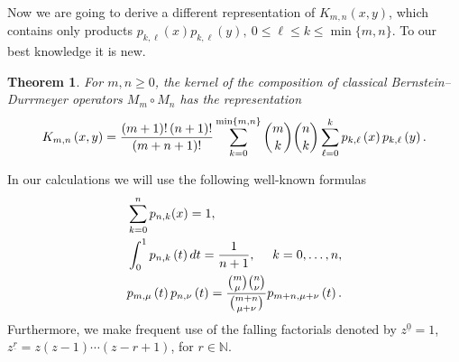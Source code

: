 \documentclass[12pt,reqno]{article}
\newtheorem{theorem}{Theorem}
\begin{document}
Now we are going to derive a different representation of $K_{m,n}\left(x,y\right) $, which contains only products 
$p_{k,\ell}\left(x\right) p_{k,\ell}\left(y \right), \ 0\le \ell \le k \le \min \{m,n\}$. 
To our best knowledge it is new. 

\begin{theorem}
\label{P1} \label{corollary-kernel-K_m,n[-1]}For $m,n\geq 0$, the kernel of
the composition of classical Bernstein--Durrmeyer operators $M_{m}\circ
M_{n} $ has the representation 
\begin{equation*}
K_{m,n}\left( x,y\right) =\frac{\left( m+1\right) !\left( n+1\right) !}{%
\left( m+n+1\right) !}\sum_{k=0}^{\min \{m,n\}}\binom{m}{k}\binom{n}{k}%
\sum_{\ell =0}^{k}p_{k,\ell }\left( x\right) p_{k,\ell }\left( y\right) .
\end{equation*}
\end{theorem}

In our calculations we will use the following well-known formulas 
\begin{align}
& \displaystyle \sum_{k=0}^{n}p_{n,k}(x)=1,  \label{eq.w1} \\
& \int_{0}^{1}p_{n,k}\left( t\right) dt=\frac{1}{n+1}, \text{ \quad } k=0,\ldots,n ,  \label{eq.w2} \\
& p_{m,\mu }\left( t\right) p_{n,\nu }\left( t\right) =\frac{\binom{m}{\mu }%
\binom{n}{\nu }}{\binom{m+n}{\mu +\nu }}p_{m+n,\mu +\nu }\left( t\right) .
\label{eq.w3}
\end{align}
Furthermore, we make frequent use of the falling factorials denoted by $z^{\underline{0}}=1$, $z^{\underline{r}}=z\left( z-1\right) \cdots
\left( z-r+1\right) $, for $r\in \mathbb{N}$.
\end{document}
